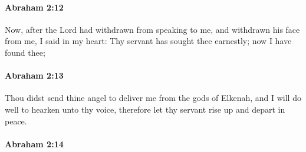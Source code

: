 		\paragraph{Abraham 2:12} %
			\label{ABRAHAM-2-12}

			Now, after the Lord had withdrawn from speaking to me, and withdrawn his face from me, I said in my heart: Thy servant has sought thee earnestly; now I have found thee;


		\paragraph{Abraham 2:13} %
			\label{ABRAHAM-2-13}

			Thou didst send thine angel to deliver me from the gods of Elkenah, and I will do well to hearken unto thy voice, therefore let thy servant rise up and depart in peace.


		\paragraph{Abraham 2:14} %
			\label{ABRAHAM-2-14}

